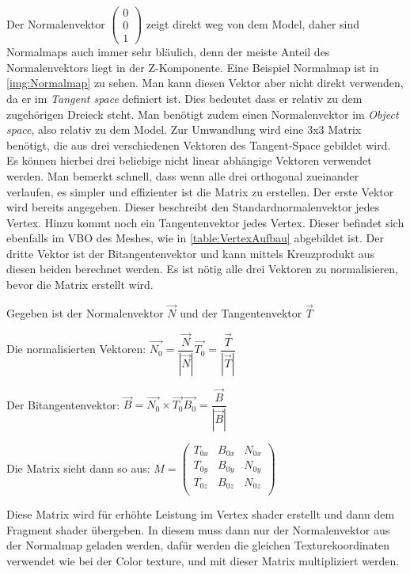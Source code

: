 Der Normalenvektor $\begin{pmatrix}
	0 \\ 0 \\ 1
\end{pmatrix}$ zeigt direkt weg von dem Model, daher sind Normalmaps auch immer sehr bläulich, denn der meiste Anteil des Normalenvektors liegt in der Z-Komponente. Eine Beispiel Normalmap ist in \cref{img:Normalmap} zu sehen. Man kann diesen Vektor aber nicht direkt verwenden, da er im \textit{Tangent space} definiert ist. Dies bedeutet dass er relativ zu dem zugehörigen Dreieck steht.
Man benötigt zudem einen Normalenvektor im \textit{Object space}, also relativ zu dem Model. 
Zur Umwandlung wird eine 3x3 Matrix benötigt, die aus drei verschiedenen Vektoren des Tangent-Space gebildet wird. 
Es können hierbei drei beliebige nicht linear abhängige Vektoren verwendet werden. Man bemerkt schnell, dass wenn alle drei orthogonal zueinander verlaufen, es simpler und effizienter ist die Matrix zu erstellen. 
Der erste Vektor wird bereits angegeben. Dieser beschreibt den Standardnormalenvektor jedes Vertex. Hinzu kommt noch ein Tangentenvektor jedes Vertex. Dieser befindet sich ebenfalls im \ac{VBO} des Meshes, wie in \cref{table:VertexAufbau} abgebildet ist. Der dritte Vektor ist der Bitangentenvektor
und kann mittels Kreuzprodukt aus diesen beiden berechnet werden. Es ist nötig alle drei Vektoren zu normalisieren, bevor die Matrix erstellt wird.

Gegeben ist der Normalenvektor $\overrightarrow{N}$ und der Tangentenvektor $\overrightarrow{T}$

Die normalisierten Vektoren: $\overrightarrow{N_{0}} = \dfrac{\overrightarrow{N}}{|\overrightarrow{N}|}$\qquad	$\overrightarrow{T_{0}} = \dfrac{\overrightarrow{T}}{|\overrightarrow{T}|}$

Der Bitangentenvektor: $\overrightarrow{B} = \overrightarrow{N_{0}} \times \overrightarrow{T_{0}}$\qquad	$\overrightarrow{B_{0}} = \dfrac{\overrightarrow{B}}{|\overrightarrow{B}|}$

Die Matrix sieht dann so aus: $M =  \begin{pmatrix}
T_{0x} & B_{0x} & N_{0x} \\
T_{0y} & B_{0y} & N_{0y} \\
T_{0z} & B_{0z} & N_{0z} \\
\end{pmatrix}$

Diese Matrix wird für erhöhte Leistung im Vertex shader erstellt und dann dem Fragment shader übergeben. In diesem muss dann nur der Normalenvektor aus der Normalmap geladen werden, dafür werden die gleichen Texturekoordinaten verwendet wie bei der Color texture, und mit dieser Matrix multipliziert werden.

